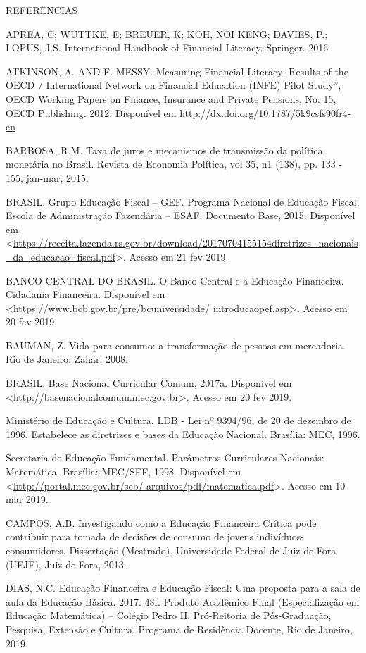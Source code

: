 REFERÊNCIAS

APREA, C; WUTTKE, E; BREUER, K; KOH, NOI KENG; DAVIES, P.; LOPUS, J.S. International Handbook of Financial Literacy. Springer. 2016

ATKINSON, A. AND F. MESSY. Measuring Financial Literacy: Results of the OECD / International Network on Financial Education (INFE) Pilot Study”, OECD Working Papers on Finance, Insurance and Private Pensions, No. 15, OECD Publishing. 2012. Disponível em \url{http://dx.doi.org/10.1787/5k9csfs90fr4-en}

BARBOSA, R.M. Taxa de juros e mecanismos de transmissão da política monetária no Brasil. Revista de Economia Política, vol 35, n1 (138), pp. 133 - 155, jan-mar, 2015.

BRASIL. Grupo Educação Fiscal – GEF. Programa Nacional de Educação Fiscal. Escola de Administração Fazendária – ESAF. Documento Base, 2015. Disponível em <\url{https://receita.fazenda.rs.gov.br/download/20170704155154diretrizes_nacionais_da_educacao_fiscal.pdf}>. Acesso em 21 fev 2019.

BANCO CENTRAL DO BRASIL. O Banco Central e a Educação Financeira. Cidadania Financeira. Disponível em <\url{https://www.bcb.gov.br/pre/bcuniversidade/ introducaopef.asp}>. Acesso em 20 fev 2019.

BAUMAN, Z. Vida para consumo: a transformação de pessoas em mercadoria. Rio de Janeiro: Zahar, 2008.

BRASIL. Base Nacional Curricular Comum, 2017a. Disponível em <\url{http://basenacionalcomum.mec.gov.br}>. Acesso em 20 fev 2019.

Ministério de Educação e Cultura. LDB - Lei nº 9394/96, de 20 de dezembro de 1996. Estabelece as diretrizes e bases da Educação Nacional. Brasília: MEC, 1996.

Secretaria de Educação Fundamental. Parâmetros Curriculares Nacionais: Matemática. Brasília: MEC/SEF, 1998. Disponível em <\url{http://portal.mec.gov.br/seb/ arquivos/pdf/matematica.pdf}>. Acesso em 10 mar 2019.

CAMPOS, A.B. Investigando como a Educação Financeira Crítica pode contribuir para tomada de decisões de consumo de jovens indivíduos-consumidores. Dissertação (Mestrado). Universidade Federal de Juiz de Fora (UFJF), Juiz de Fora, 2013.

DIAS, N.C. Educação Financeira e Educação Fiscal: Uma proposta para a sala de aula da Educação Básica. 2017. 48f. Produto Acadêmico Final (Especialização em Educação Matemática) – Colégio Pedro II, Pró-Reitoria de Pós-Graduação, Pesquisa, Extensão e Cultura, Programa de Residência Docente, Rio de Janeiro, 2019.

